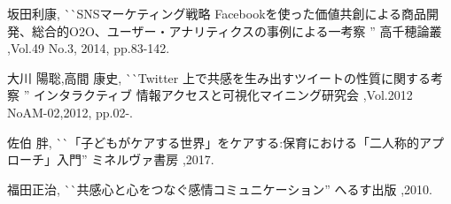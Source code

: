 \documentclass[dvipdfmx]{issj}
\begin{document}
\begin{thebibliography}{99}


   坂田利康, 
                       ^^ ^^ SNSマーケティング戦略 Facebookを使った価値共創による商品開発、総合的O2O、ユーザー・アナリティクスの事例による一考察 '' 
                       高千穂論叢 ,Vol.49 No.3, 2014, pp.83-142.

    大川 陽聡,高間 康史, 
                       ^^ ^^ Twitter 上で共感を生み出すツイートの性質に関する考察 '' 
                       インタラクティブ 情報アクセスと可視化マイニング研究会 ,Vol.2012 NoAM-02,2012, pp.02-.



   佐伯 胖,
                       ^^ ^^ 「子どもがケアする世界」をケアする:保育における「二人称的アプローチ」入門'' 
                       ミネルヴァ書房 ,2017.

   福田正治,
                       ^^ ^^ 共感心と心をつなぐ感情コミュニケーション'' 
                       へるす出版 ,2010.
  




\end{thebibliography}
\end{document}
